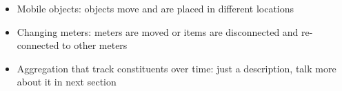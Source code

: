 \begin{itemize}
\item Mobile objects: objects move and are placed in different locations
\item Changing meters: meters are moved or items are disconnected and re-connected to other meters
\item Aggregation that track constituents over time:  just a description, talk more about it in next section
\end{itemize}